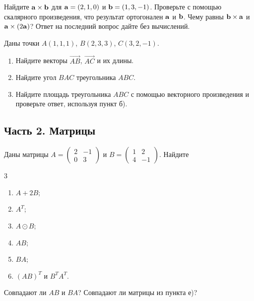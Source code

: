 \begin{exercise}
Найдите $\mathbf{a}\times\mathbf{b}$ для $\mathbf{a}=(2,1,0)$ и $\mathbf{b}=(1,3,-1)$. Проверьте с помощью скалярного произведения, что результат ортогонален $\mathbf{a}$ и $\mathbf{b}$. Чему равны $\mathbf{b}\times\mathbf{a}$ и $\mathbf{a}\times(2\mathbf{a})$? Ответ на последний вопрос дайте без вычислений.
\end{exercise}

\begin{exercise}
Даны точки $A(1,1,1)$, $B(2,3,3)$, $C(3,2,-1)$.
\begin{enumerate}[label=\asbuk*)]
  \item Найдите векторы $\overrightarrow{AB}$, $\overrightarrow{AC}$ и их длины.
  \item Найдите угол $BAC$ треугольника $ABC$.
  \item Найдите площадь треугольника $ABC$ с помощью векторного произведения и проверьте ответ, используя пункт б).
\end{enumerate}
\end{exercise}

\subsection*{Часть 2. Матрицы}

\begin{exercise}
Даны матрицы $A=\begin{pmatrix}2&-1\\0&3\end{pmatrix}$ и $B=\begin{pmatrix}1&2\\4&-1\end{pmatrix}$. Найдите
\begin{multicols}{3}
\begin{enumerate}[label=\asbuk*)]
  \item $A+2B$;
  \item $A^T$;
  \item $A\odot B$;
  \item $AB$;
  \item $BA$;
  \item $(AB)^T$ и $B^TA^T$.
\end{enumerate}
\end{multicols}
Совпадают ли $AB$ и $BA$? Совпадают ли матрицы из пункта е)?
\end{exercise}

